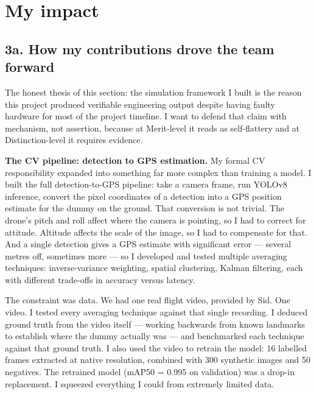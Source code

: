 \section{My impact}


\subsection{3a. How my contributions drove the team forward}

The honest thesis of this section: the simulation framework I built is the reason this project produced verifiable engineering output despite having faulty hardware for most of the project timeline. I want to defend that claim with mechanism, not assertion, because at Merit-level it reads as self-flattery and at Distinction-level it requires evidence.

\textbf{The CV pipeline: detection to GPS estimation.} My formal CV responsibility expanded into something far more complex than training a model. I built the full detection-to-GPS pipeline: take a camera frame, run YOLOv8 inference, convert the pixel coordinates of a detection into a GPS position estimate for the dummy on the ground. That conversion is not trivial. The drone's pitch and roll affect where the camera is pointing, so I had to correct for attitude. Altitude affects the scale of the image, so I had to compensate for that. And a single detection gives a GPS estimate with significant error --- several metres off, sometimes more --- so I developed and tested multiple averaging techniques: inverse-variance weighting, spatial clustering, Kalman filtering, each with different trade-offs in accuracy versus latency.

The constraint was data. We had one real flight video, provided by Sid. One video. I tested every averaging technique against that single recording. I deduced ground truth from the video itself --- working backwards from known landmarks to establish where the dummy actually was --- and benchmarked each technique against that ground truth. I also used the video to retrain the model: 16 labelled frames extracted at native resolution, combined with 300 synthetic images and 50 negatives. The retrained model (mAP50 = 0.995 on validation) was a drop-in replacement. I squeezed everything I could from extremely limited data.

